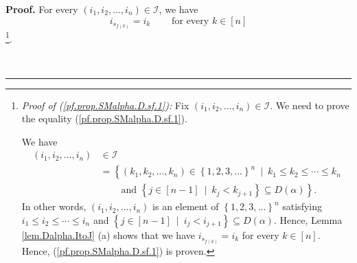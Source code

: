 \documentclass[numbers=enddot,12pt,final,onecolumn,notitlepage,abstracton]{scrartcl}
\theoremstyle{definition}
\newenvironment{proof}[1][Proof]{\noindent\textbf{#1.} }{\ \rule{0.5em}{0.5em}}
\newenvironment{verlong}{}{}
\begin{document}
\begin{verlong}
\begin{footnotesize}
\begin{proof}
For every $\left(  i_{1},i_{2},\ldots,i_{n}\right)  \in\mathcal{I}$, we have%
\begin{equation}
i_{s_{f\left(  k\right)  }}=i_{k}\ \ \ \ \ \ \ \ \ \ \text{for every }%
k\in\left[  n\right]  \label{pf.prop.SMalpha.D.sf.1}%
\end{equation}
\footnote{\textit{Proof of (\ref{pf.prop.SMalpha.D.sf.1}):} Fix $\left(
i_{1},i_{2},\ldots,i_{n}\right)  \in\mathcal{I}$. We need to prove the
equality (\ref{pf.prop.SMalpha.D.sf.1}).
\par
We have%
\begin{align*}
\left(  i_{1},i_{2},\ldots,i_{n}\right)   &  \in\mathcal{I}\\
&  =\left\{  \left(  k_{1},k_{2},\ldots,k_{n}\right)  \in\left\{
1,2,3,\ldots\right\}  ^{n}\ \mid\ k_{1}\leq k_{2}\leq\cdots\leq k_{n}\right.
\\
&  \ \ \ \ \ \ \ \ \ \ \left.  \text{and }\left\{  j\in\left[  n-1\right]
\ \mid\ k_{j}<k_{j+1}\right\}  \subseteq D\left(  \alpha\right)  \right\}  .
\end{align*}
In other words, $\left(  i_{1},i_{2},\ldots,i_{n}\right)  $ is an element of
$\left\{  1,2,3,\ldots\right\}  ^{n}$ satisfying $i_{1}\leq i_{2}\leq
\cdots\leq i_{n}$ and $\left\{  j\in\left[  n-1\right]  \ \mid\ i_{j}%
<i_{j+1}\right\}  \subseteq D\left(  \alpha\right)  $. Hence, Lemma
\ref{lem.Dalpha.ItoJ} (a) shows that we have $i_{s_{f\left(  k\right)  }%
}=i_{k}$ for every $k\in\left[  n\right]  $. Hence,
(\ref{pf.prop.SMalpha.D.sf.1}) is proven.}.


\end{proof}
\end{footnotesize}
\end{verlong}
\end{document}
